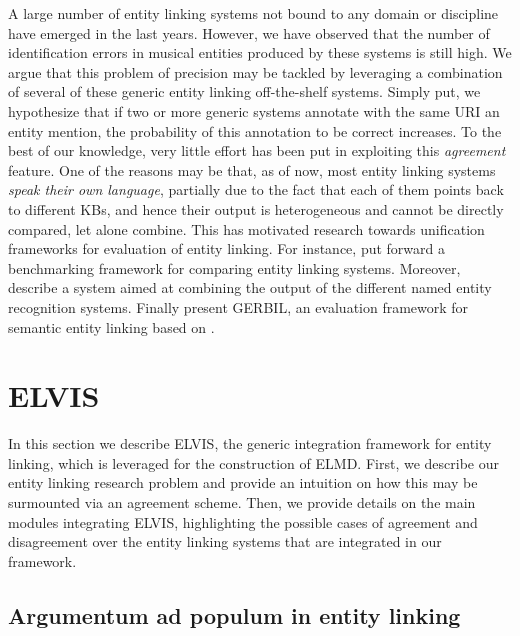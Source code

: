 A large number of entity linking systems not bound to any domain or discipline have emerged in the last years. However, we have observed that the number of identification errors in musical entities produced by these systems is still high. We argue that this problem of precision may be tackled by leveraging a combination of several of these generic entity linking off-the-shelf systems. Simply put, we hypothesize that if two or more generic systems annotate with the same URI an entity mention, the probability of this annotation to be correct increases. To the best of our knowledge, very little effort has been put in exploiting this \textit{agreement} feature. One of the reasons may be that, as of now, most entity linking systems \textit{speak their own language}, partially due to the fact that each of them points back to different KBs, and hence their output is heterogeneous and cannot be directly compared, let alone combine. This has motivated research towards unification frameworks for evaluation of entity linking. For instance, \cite{Cornolti2013} put forward a benchmarking framework for comparing entity linking systems. Moreover, \cite{Rizzo2014} describe a system aimed at combining the output of the different named entity recognition systems. Finally \cite{Usbeck2015} present \textsc{GERBIL}, an evaluation framework for semantic entity linking based on \cite{Cornolti2013}. %



\section{ELVIS}
\label{sec:linking:elvis}

In this section we describe \textsc{ELVIS}, the generic integration framework for entity linking, which is leveraged for the construction of \textsc{ELMD}. First, we describe our entity linking research problem and provide an intuition on how this may be surmounted via an agreement scheme. Then, we provide details on the main modules integrating \textsc{ELVIS}, highlighting the possible cases of agreement and disagreement over the entity linking systems that are integrated in our framework.

\subsection{Argumentum ad populum in entity linking}
\label{sec:linking:agreement}

